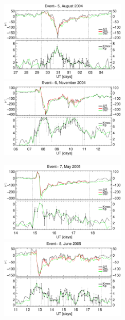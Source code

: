 \documentclass[a4paper,fleqn]{cas-dc}
\begin{document}
\begin{figure}[h!]
     \centerline{\Large \bf   
      \hspace{0.275\textwidth}  \color{black}{}
       \hspace{0.295\textwidth}  \color{black}{}
         \hfill}
      \includegraphics[width=6.0cm]{images/dH_approx/diono_valid_V4_2004-08-27.eps}     
      \includegraphics[width=6.0cm]{images/dH_approx/diono_valid_V4_2004-11-06.eps}
       \centerline{\Large \bf   
      \hspace{0.275\textwidth}  \color{black}{}
       \hspace{0.295\textwidth}  \color{black}{}
         \hfill}
       \includegraphics[width=6.0cm]{images/dH_approx/diono_valid_V4_2005-05-14.eps}     
       \includegraphics[width=6.0cm]{images/dH_approx/diono_valid_V4_2005-06-11.eps}


\end{figure}
\end{document}

